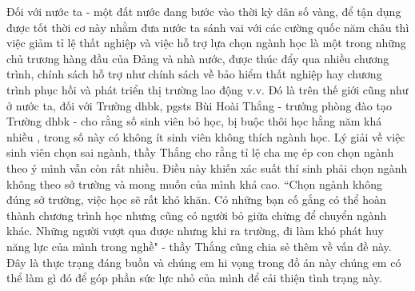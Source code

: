 Đối với nước ta - một đất nước đang bước vào thời kỳ dân số vàng, để tận dụng được tốt thời cơ này nhằm đưa nước ta sánh vai với các cường quốc năm châu thì việc giảm tỉ lệ thất nghiệp và việc hỗ trợ lựa chọn ngành học là một trong những chủ trương hàng đầu của Đảng và nhà nước, được thúc đẩy qua nhiều chương trình, chính sách hỗ trợ như chính sách về bảo hiểm thất nghiệp hay chương trình phục hồi và phát triển thị trường lao động v.v. Đó là trên thế giới cũng như ở nước ta, đối với Trường \acrshort{dhbk}, \acrshort{pgsts} Bùi Hoài Thắng - trưởng phòng đào tạo Trường \acrshort{dhbk} - cho rằng số sinh viên bỏ học, bị buộc thôi học hằng năm khá nhiều \cite{tuoitre1}, trong số này có không ít sinh viên không thích ngành học. Lý giải về việc sinh viên chọn sai ngành, thầy Thắng cho rằng tỉ lệ cha mẹ ép con chọn ngành theo ý mình vẫn còn rất nhiều. Điều này khiến xác suất thí sinh phải chọn ngành không theo sở trường và mong muốn của mình khá cao. ``Chọn ngành không đúng sở trường, việc học sẽ rất khó khăn. Có những bạn cố gắng có thể hoàn thành chương trình học nhưng cũng có người bỏ giữa chừng để chuyển ngành khác. Những người vượt qua được nhưng khi ra trường, đi làm khó phát huy năng lực của mình trong nghề" - thầy Thắng cũng chia sẻ thêm về vấn đề này. Đây là thực trạng đáng buồn và chúng em hi vọng trong đồ án này chúng em có thể làm gì đó để góp phần sức lực nhỏ của mình để cải thiện tình trạng này. 
